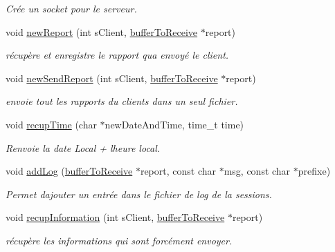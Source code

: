 \begin{DoxyCompactItemize}
\begin{DoxyCompactList}\small\item\em Crée un socket pour le serveur. \end{DoxyCompactList}\item 
void \hyperlink{group__serveur_ga9588f65b1e3c085c64a2b7d911a6f9b0}{new\+Report} (int s\+Client, \hyperlink{structsbuffer_to_receive}{buffer\+To\+Receive} $\ast$report)
\begin{DoxyCompactList}\small\item\em récupère et enregistre le rapport qu\textquotesingle{}a envoyé le client. \end{DoxyCompactList}\item 
void \hyperlink{group__serveur_gab6e538890028e2f672b9462c9e5b173b}{new\+Send\+Report} (int s\+Client, \hyperlink{structsbuffer_to_receive}{buffer\+To\+Receive} $\ast$report)
\begin{DoxyCompactList}\small\item\em envoie tout les rapports du clients dans un seul fichier. \end{DoxyCompactList}\item 
void \hyperlink{group__serveur_gaad0cdd4017fa30e4b57becc25487a6d5}{recup\+Time} (char $\ast$new\+Date\+And\+Time, time\+\_\+t time)
\begin{DoxyCompactList}\small\item\em Renvoie la date Local + l\textquotesingle{}heure local. \end{DoxyCompactList}\item 
void \hyperlink{group__serveur_ga92620a415736d7b5c4c6bae486e95b61}{add\+Log} (\hyperlink{structsbuffer_to_receive}{buffer\+To\+Receive} $\ast$report, const char $\ast$msg, const char $\ast$prefixe)
\begin{DoxyCompactList}\small\item\em Permet d\textquotesingle{}ajouter un entrée dans le fichier de log de la sessions. \end{DoxyCompactList}\item 
void \hyperlink{group__serveur_ga804db011cd3bba22e33e922af9a52c55}{recup\+Information} (int s\+Client, \hyperlink{structsbuffer_to_receive}{buffer\+To\+Receive} $\ast$report)
\begin{DoxyCompactList}\small\item\em récupère les informations qui sont forcément envoyer. \end{DoxyCompactList}\end{DoxyCompactItemize}
